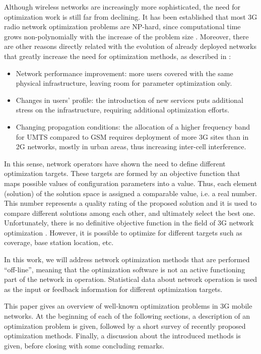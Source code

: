 Although wireless networks are increasingly more sophisticated, the
need for optimization work is still far from declining. It has been
established that most 3G radio network optimization problems are NP-hard,
since computational time grows non-polynomially with the increase
of the problem size \cite{amaldi:planning.umts.base.station.location}.
Moreover, there are other reasons directly related with the evolution
of already deployed networks that greatly increase the need for optimization
methods, as described in \cite{nawrocki2006understanding}:
\begin{itemize}
\item Network performance improvement: more users covered with the same
physical infrastructure, leaving room for parameter optimization only.
\item Changes in users\textquoteright{} profile: the introduction of new
services puts additional stress on the infrastructure, requiring additional
optimization efforts.
\item Changing propagation conditions: the allocation of a higher frequency
band for UMTS compared to GSM requires deployment of more 3G sites
than in 2G networks, mostly in urban areas, thus increasing inter-cell
interference.
\end{itemize}
In this sense, network operators have shown the need to define different
optimization targets. These targets are formed by an objective function
that maps possible values of configuration parameters into a value.
Thus, each element (solution) of the solution space is assigned a
comparable value, i.e. a real number. This number represents a quality
rating of the proposed solution and it is used to compare different
solutions among each other, and ultimately select the best one. Unfortunately,
there is no definitive objective function in the field of 3G network
optimization \cite{nawrocki2006understanding}. However, it is possible
to optimize for different targets such as coverage, base station location,
etc.

In this work, we will address network optimization methods that are
performed ``off-line'', meaning that the optimization software is
not an active functioning part of the network in operation. Statistical
data about network operation is used as the input or feedback information
for different optimization targets.

This paper gives an overview of well-known optimization problems in
3G mobile networks. At the beginning of each of the following sections,
a description of an optimization problem is given, followed by a short
survey of recently proposed optimization methods. Finally, a discussion
about the introduced methods is given, before closing with some concluding
remarks.


